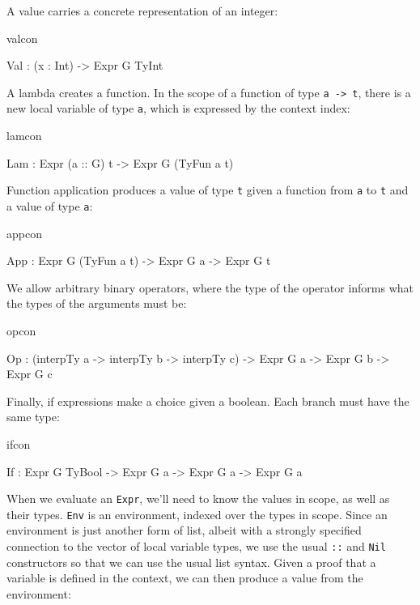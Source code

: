 \noindent
A value carries a concrete representation of an integer: 

\begin{SaveVerbatim}{valcon}

Val : (x : Int) -> Expr G TyInt

\end{SaveVerbatim}

\noindent
A lambda creates a function. In the scope of a function of type \texttt{a -> t}, there is
a new local variable of type \texttt{a}, which is expressed by the context index:

\begin{SaveVerbatim}{lamcon}

Lam : Expr (a :: G) t -> Expr G (TyFun a t)

\end{SaveVerbatim}

\noindent
Function application produces a value of type \texttt{t} given a function from 
\texttt{a} to \texttt{t}
and a value of type \texttt{a}:

\begin{SaveVerbatim}{appcon}

App : Expr G (TyFun a t) -> Expr G a -> Expr G t

\end{SaveVerbatim}

\noindent
We allow arbitrary binary operators, where the type of the operator
informs what the types of the arguments must be:

\begin{SaveVerbatim}{opcon}

Op  : (interpTy a -> interpTy b -> interpTy c) -> Expr G a -> Expr G b -> 
      Expr G c

\end{SaveVerbatim}

\noindent
Finally, if expressions make a choice given a boolean. Each branch must
have the same type:

\begin{SaveVerbatim}{ifcon}

If  : Expr G TyBool -> Expr G a -> Expr G a -> Expr G a

\end{SaveVerbatim}

\noindent
When we evaluate an \texttt{Expr}, we'll need to know the values in scope, as well as
their types. \texttt{Env} is an environment, indexed over the types in scope.
Since an environment is just another form of list, albeit with a strongly specified connection
to the vector of local variable types, we use the usual \texttt{::} and \texttt{Nil}
constructors so that we can use the usual list syntax. Given a proof that a variable
is defined in the context, we can then produce a value from the environment:

